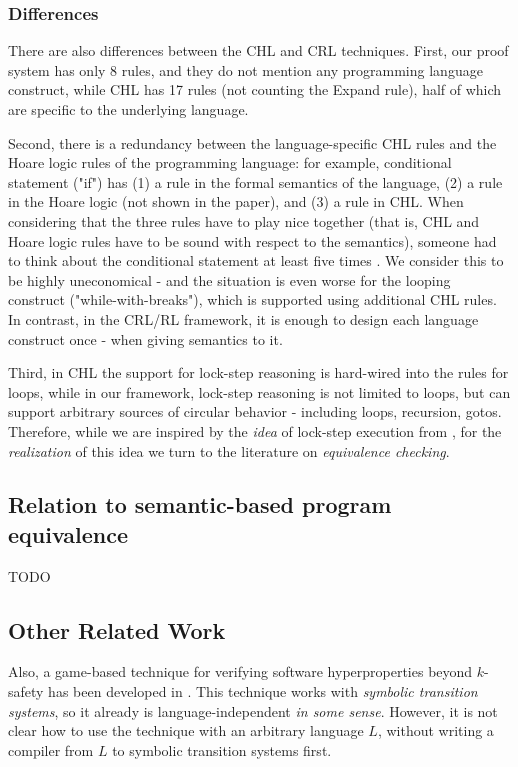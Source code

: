 \documentclass{article}
\begin{document}
\subsubsection{Differences}
There are also differences between the CHL and CRL techniques.
First, our proof system has only 8 rules, and they do not mention any programming language construct,
while CHL has 17 rules (not counting the Expand rule), half of which are specific to the underlying language.

Second, there is a redundancy between the language-specific CHL rules and the Hoare logic rules of the
programming language: for example, conditional statement ("if") has (1) a rule in the formal semantics of the language,
(2) a rule in the Hoare logic (not shown in the paper), and (3) a rule in CHL.
When considering that the three rules have to play nice together (that is, CHL and Hoare logic rules have to be sound with respect to the semantics), someone had to think about the conditional statement at least five times .
We consider this to be highly uneconomical
- and the situation
is even worse for the looping construct ("while-with-breaks"), which is supported using additional CHL rules.
In contrast, in the CRL/RL framework, it is enough to design each language construct once - when giving
semantics to it.


Third, in CHL the support for lock-step reasoning is hard-wired into the rules for loops,
while in our framework, lock-step reasoning is not limited to loops, but can support arbitrary sources
of circular behavior - including loops, recursion, gotos.
Therefore, while we are inspired by the \emph{idea} of lock-step execution from \cite{SousaD16},
for the \emph{realization} of this idea we turn to the literature on \emph{equivalence checking}.

\subsection{Relation to semantic-based program equivalence}

TODO

\subsection{Other Related Work}


Also, a game-based technique for verifying software hyperproperties beyond $k$-safety
has been developed in \cite{BeutnerF22}.
This technique works with \emph{symbolic transition systems},
so it already is language-independent \emph{in some sense}. However, it is not clear how to use the technique
with an arbitrary language $L$, without writing a compiler from $L$ to symbolic transition systems first.
\end{document}
